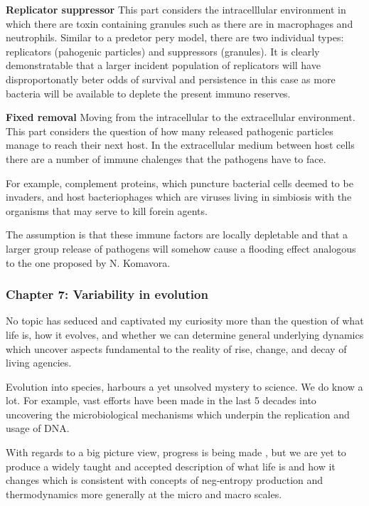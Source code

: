 \noindent
\textbf{Replicator suppressor}
This part considers the intracelllular environment in which there are toxin containing granules such as there are in macrophages and neutrophils.  Similar to a predetor pery model,  there are two individual types: replicators (pahogenic particles) and suppressors (granules).  It is clearly demonstratable that a larger incident population of replicators will have disproportonatly beter odds of survival and persistence in this case as more bacteria will be available to deplete the present immuno reserves. 



\noindent
\textbf{Fixed removal}
Moving from the intracellular to the extracellular environment. This part considers the question of how many released pathogenic particles manage to reach their next host.  In the extracellular medium between host cells there are a number of immune chalenges that the pathogens have to face. \par
For example,  complement proteins, which puncture bacterial cells deemed to be invaders,  and host bacteriophages which are viruses living in simbiosis with the organisms that may serve to kill forein agents. \par
The assumption is that these immune factors are locally depletable and that a larger group release of pathogens will somehow cause a flooding effect analogous to the one proposed by N. Komavora. 








\subsubsection{Chapter 7: Variability in evolution}
No topic has seduced and captivated my curiosity more than the question of what life is,  how it evolves,  and whether we can determine general underlying dynamics which uncover aspects fundamental to the reality of rise,  change,  and decay of living agencies. \par

Evolution into species, harbours a yet unsolved mystery to science.  We do know a lot.  For example,  vast efforts have been made in the last 5 decades into uncovering the microbiological mechanisms which underpin the replication and usage of DNA. \par


With regards to a big picture view,  progress is being made \cite{sharma2023assembly},  but we are yet to produce a widely taught and accepted description of what life is and how it changes which is consistent with concepts of neg-entropy production and thermodynamics more generally at the micro and macro scales. \par

